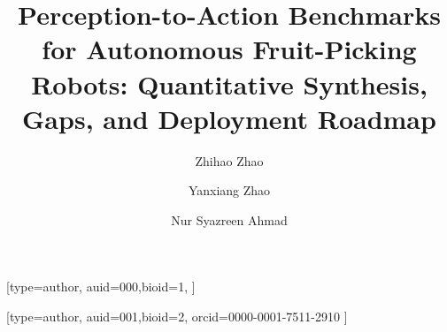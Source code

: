 \documentclass[a4paper,fleqn]{cas-dc}
\begin{document}
\let\ref\Cref 		
\let\eqref\Cref 	
\let\autoref\Cref 	
\let\WriteBookmarks\relax
\def\floatpagepagefraction{1}
\def\textpagefraction{.001}


\title [mode = title]{Perception-to-Action Benchmarks for Autonomous Fruit-Picking Robots: Quantitative Synthesis, Gaps, and Deployment Roadmap}




\author[1,2]{Zhihao Zhao}[type=author, 
                        auid=000,bioid=1,
                        ]

\address[1]{School of Electrical and Electronic Engineering, Universiti Sains Malaysia, 14300 Nibong Tebal, Penang, Malaysia}

\author[3]{Yanxiang Zhao}
\author[1]{Nur Syazreen Ahmad}[type=author, 
                        auid=001,bioid=2,
                        orcid=0000-0001-7511-2910
                        ]
\cormark[1]

\address[2]{YanTai Engineering and Technology College, 264006 YanTai, Shandong, China}
\address[3]{Central South University, Changsha, Hunan, 410083, China}
\end{document}

